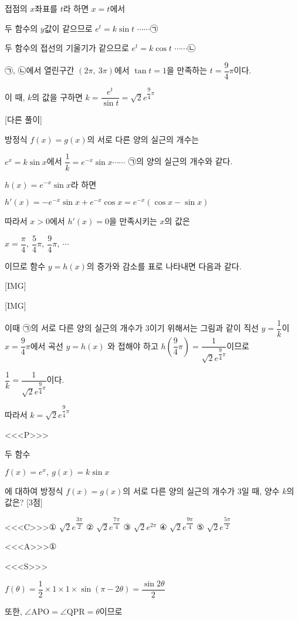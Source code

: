 \documentclass{oblivoir}
\begin{document}
접점의 $x$좌표를 $t$라 하면 $x=t$에서

두 함수의 $y$값이 같으므로 $e^{t}=k\sin t$ $\cdots\cdots$㉠

두 함수의 접선의 기울기가 같으므로 $e^{t}=k\cos t$ $\cdots\cdots$㉡

㉠, ㉡에서 열린구간 $(2\pi ,\: 3\pi)$에서 $\tan t=1$을 만족하는 $t =\dfrac{9}{4}\pi$이다.

이 때, $k$의 값을 구하면 $k=\dfrac{e^{t}}{\sin t}=\sqrt{2}e^{\dfrac{9}{4}\pi}$

[다른 풀이]

방정식 $f(x)=g(x)$의 서로 다른 양의 실근의 개수는

$e^{x}= k\sin x$에서 $\dfrac{1}{k}=e^{-x}\sin x$$\cdots\cdots$ ㉠의 양의 실근의 개수와 같다.  

$h(x)=e^{-x}\sin x$라 하면

$h'(x)=-e^{-x}\sin x +e^{-x}\cos x =e^{-x}(\cos x -\sin x)$

따라서 $x>0$에서 $h'(x)=0$을 만족시키는 $x$의 값은

$x=\dfrac{\pi}{4},\:\dfrac{5}{4}\pi ,\:\dfrac{9}{4}\pi ,\:\cdots$

이므로 함수 $y=h(x)$의 증가와 감소를 표로 나타내면 다음과 같다.

[IMG]

[IMG]

이때 ㉠의 서로 다른 양의 실근의 개수가 $3$이기 위해서는 그림과 같이 직선 $y=\dfrac{1}{k}$이 $x=\dfrac{9}{4}\pi$에서 곡선 $y=h(x)$ 와 접해야 하고 $h\left(\dfrac{9}{4}\pi\right)=\dfrac{1}{\sqrt{2}e^{\dfrac{9}{4}\pi}}$이므로

$\dfrac{1}{k}=\dfrac{1}{\sqrt{2}e^{\dfrac{9}{4}\pi}}$이다.

따라서 $k=\sqrt{2}e^{\dfrac{9}{4}\pi}$

<<<P>>>

두 함수

$f(x)=e^{x},\:g(x)=k\sin x$

에 대하여 방정식 $f(x)=g(x)$의 서로 다른 양의 실근의 개수가 $3$일 때, 양수 $k$의 값은? [3점]

<<<C>>>① $\sqrt{2}e^{\dfrac{3\pi}{2}}$ ② $\sqrt{2}e^{\dfrac{7\pi}{4}}$ ③ $\sqrt{2}e^{2\pi}$ ④ $\sqrt{2}e^{\dfrac{9\pi}{4}}$ ⑤ $\sqrt{2}e^{\dfrac{5\pi}{2}}$

<<<A>>>①

<<<S>>>

$f(\theta)=\dfrac{1}{2}\times 1\times 1\times\sin(\pi -2\theta)=\dfrac{\sin 2\theta}{2}$

또한, $\angle\mathrm{APO}=\angle\mathrm{QPR}=\theta$이므로
\end{document}
